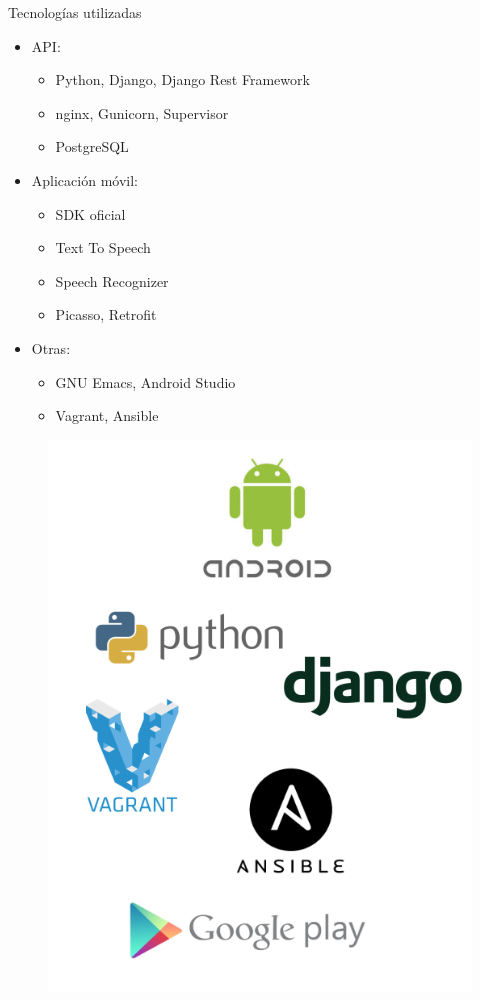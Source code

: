 \documentclass[10pt,xcolor=svgnames]{beamer}
\begin{document}
\begin{frame}{Tecnologías utilizadas}

  \begin{minipage}[t]{.6\textwidth}
    \begin{itemize}
    \item API:
      \begin{itemize}
      \item Python, Django, Django Rest Framework
      \item nginx, Gunicorn, Supervisor
      \item PostgreSQL
      \end{itemize}
    \item Aplicación móvil:
      \begin{itemize}
      \item SDK oficial
      \item Text To Speech
      \item Speech Recognizer
      \item Picasso, Retrofit
      \end{itemize}
    \item Otras:
      \begin{itemize}
      \item GNU Emacs, Android Studio
      \item Vagrant, Ansible
      \end{itemize}    
    \end{itemize}
  \end{minipage}%
  \begin{minipage}[t]{.4\textwidth}    
    \begin{figure}[H]
      \centering
      \includegraphics[width=\textwidth]{./img/nube-tecnologias}

\end{figure}
\end{minipage}
\end{frame}
\end{document}
